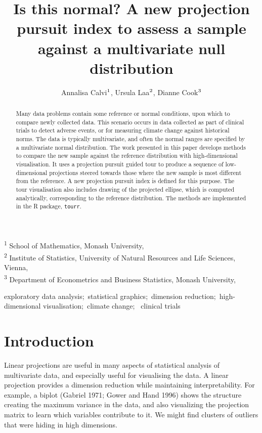 \documentclass[
  12pt,
]{interact}
\title{Is this normal? A new projection pursuit index to assess a sample
against a multivariate null distribution}
\author{Annalisa Calvi$\textsuperscript{1}$, Ursula
Laa$\textsuperscript{2}$, Dianne Cook$\textsuperscript{3}$}
\begin{document}
\captionsetup{labelsep=space}
\maketitle
\textsuperscript{1} School of Mathematics, Monash
University,  \\ \textsuperscript{2} Institute of Statistics, University
of Natural Resources and Life Sciences,
Vienna,  \\ \textsuperscript{3} Department of Econometrics and Business
Statistics, Monash University,  
\begin{abstract}
Many data problems contain some reference or normal conditions, upon
which to compare newly collected data. This scenario occurs in data
collected as part of clinical trials to detect adverse events, or for
measuring climate change against historical norms. The data is typically
multivariate, and often the normal ranges are specified by a
multivariate normal distribution. The work presented in this paper
develops methods to compare the new sample against the reference
distribution with high-dimensional visualisation. It uses a projection
pursuit guided tour to produce a sequence of low-dimensional projections
steered towards those where the new sample is most different from the
reference. A new projection pursuit index is defined for this purpose.
The tour visualisation also includes drawing of the projected ellipse,
which is computed analytically, corresponding to the reference
distribution. The methods are implemented in the R package,
\texttt{tourr}.
\end{abstract}
\begin{keywords}
\def\sep{;\ }
exploratory data analysis\sep statistical graphics\sep dimension
reduction\sep high-dimensional visualisation\sep climate change\sep 
clinical trials
\end{keywords}

\section{Introduction}\label{introduction}

Linear projections are useful in many aspects of statistical analysis of
multivariate data, and especially useful for visualising the data. A
linear projection provides a dimension reduction while maintaining
interpretability. For example, a biplot (Gabriel 1971; Gower and Hand
1996) shows the structure creating the maximum variance in the data, and
also visualizing the projection matrix to learn which variables
contribute to it. We might find clusters of outliers that were hiding in
high dimensions.
\end{document}
